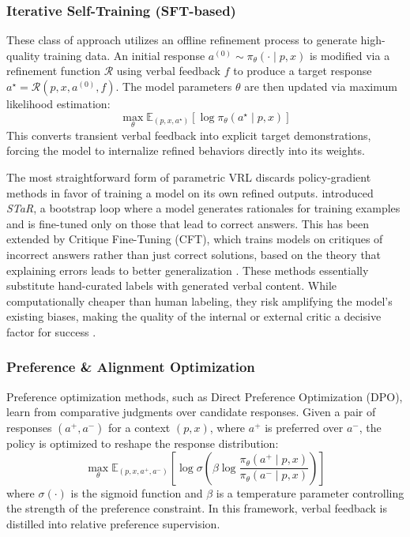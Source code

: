 \subsubsection{Iterative Self-Training (SFT-based)}

These class of approach utilizes an offline refinement process to generate high-quality training data. An initial response $a^{(0)} \sim \pi_\theta(\cdot \mid p, x)$ is modified via a refinement function $\mathcal{R}$ using verbal feedback $f$ to produce a target response $a^\star = \mathcal{R}(p, x, a^{(0)}, f)$. The model parameters $\theta$ are then updated via maximum likelihood estimation:
\begin{equation}
    \max_\theta \mathbb{E}_{(p, x, a^\star)} \left[ \log \pi_\theta(a^\star \mid p, x) \right]
\end{equation}
This converts transient verbal feedback into explicit target demonstrations, forcing the model to internalize refined behaviors directly into its weights.

The most straightforward form of parametric VRL discards policy-gradient methods in favor of training a model on its own refined outputs. \citet{zelikman2022star} introduced \textit{STaR}, a bootstrap loop where a model generates rationales for training examples and is fine-tuned only on those that lead to correct answers. This has been extended by Critique Fine-Tuning (CFT), which trains models on critiques of incorrect answers rather than just correct solutions, based on the theory that explaining errors leads to better generalization \citep{wang2025cft}. These methods essentially substitute hand-curated labels with generated verbal content. While computationally cheaper than human labeling, they risk amplifying the model's existing biases, making the quality of the internal or external critic a decisive factor for success \citep{kapusuzoglu2025cgd}.

\subsubsection{Preference \& Alignment Optimization}
Preference optimization methods, such as Direct Preference Optimization (DPO), learn from comparative judgments over candidate responses. Given a pair of responses $(a^+, a^-)$ for a context $(p, x)$, where $a^+$ is preferred over $a^-$, the policy is optimized to reshape the response distribution:
\begin{equation}
    \max_\theta \mathbb{E}_{(p, x, a^+, a^-)} \left[ \log \sigma \left( \beta \log \frac{\pi_\theta(a^+ \mid p, x)}{\pi_\theta(a^- \mid p, x)} \right) \right]
\end{equation}
where $\sigma(\cdot)$ is the sigmoid function and $\beta$ is a temperature parameter controlling the strength of the preference constraint. In this framework, verbal feedback is distilled into relative preference supervision.

